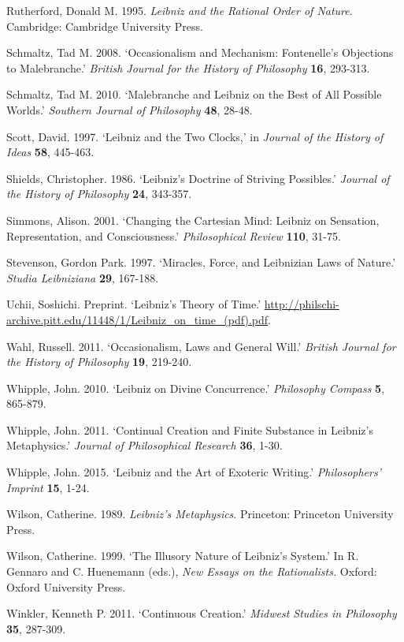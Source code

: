 \documentclass{article}
\begin{document}
Rutherford, Donald M. 1995. \emph{Leibniz and the Rational Order of
Nature}. Cambridge: Cambridge University Press.

Schmaltz, Tad M. 2008. `Occasionalism and Mechanism: Fontenelle's
Objections to Malebranche.' \emph{British Journal for the History of
Philosophy} \textbf{16}, 293-313.

Schmaltz, Tad M. 2010. `Malebranche and Leibniz on the Best of All
Possible Worlds.' \emph{Southern Journal of Philosophy} \textbf{48},
28-48.

Scott, David. 1997. `Leibniz and the Two Clocks,' in \emph{Journal of
the History of Ideas} \textbf{58}, 445-463.

Shields, Christopher. 1986. `Leibniz's Doctrine of Striving Possibles.'
\emph{Journal of the History of Philosophy} \textbf{24}, 343-357.

Simmons, Alison. 2001. `Changing the Cartesian Mind: Leibniz on
Sensation, Representation, and Consciousness.' \emph{Philosophical
Review} \textbf{110}, 31-75.

Stevenson, Gordon Park. 1997. `Miracles, Force, and Leibnizian Laws of
Nature.' \emph{Studia Leibniziana} \textbf{29}, 167-188.

Uchii, Soshichi. Preprint. `Leibniz's Theory of Time.'
\url{http://philschi-archive.pitt.edu/11448/1/Leibniz_on_time_(pdf).pdf}.

Wahl, Russell. 2011. `Occasionalism, Laws and General Will.'
\emph{British Journal for the History of Philosophy} \textbf{19},
219-240.

Whipple, John. 2010. `Leibniz on Divine Concurrence.' \emph{Philosophy
Compass} \textbf{5}, 865-879.

Whipple, John. 2011. `Continual Creation and Finite Substance in
Leibniz's Metaphysics.' \emph{Journal of Philosophical Research}
\textbf{36}, 1-30.

Whipple, John. 2015. `Leibniz and the Art of Exoteric Writing.'
\emph{Philosophers' Imprint} \textbf{15}, 1-24.

Wilson, Catherine. 1989. \emph{Leibniz's Metaphysics}. Princeton:
Princeton University Press.

Wilson, Catherine. 1999. `The Illusory Nature of Leibniz's System.' In
R. Gennaro and C. Huenemann (eds.), \emph{New Essays on the
Rationalists.} Oxford: Oxford University Press.

Winkler, Kenneth P. 2011. `Continuous Creation.' \emph{Midwest Studies
in Philosophy} \textbf{35}, 287-309.
\printbibliography
\end{document}
